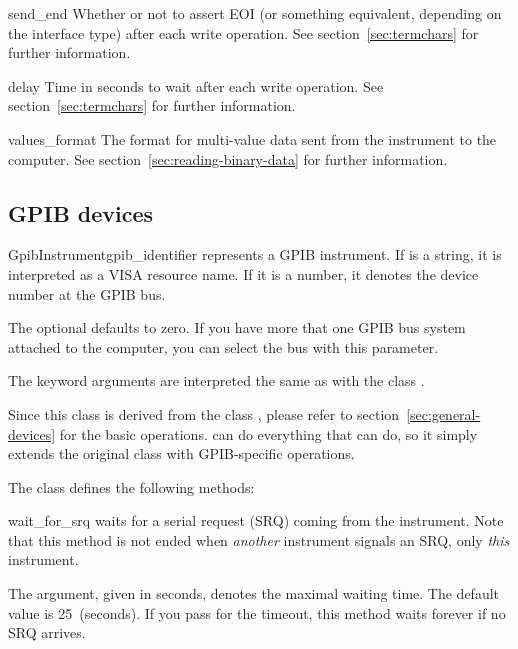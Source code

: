 \documentclass{howto}
\begin{document}
\begin{memberdesc}{send_end}
  Whether or not to assert EOI (or something equivalent, depending on the
  interface type) after each write operation.  See section~\ref{sec:termchars}
  for further information.
\end{memberdesc}

\begin{memberdesc}{delay}
  Time in seconds to wait after each write operation.  See
  section~\ref{sec:termchars} for further information.
\end{memberdesc}

\begin{memberdesc}{values_format}
  The format for multi-value data sent from the instrument to the computer.
  See section~\ref{sec:reading-binary-data} for further information.
\end{memberdesc}


\subsection{GPIB devices}
\label{sec:gpib-devices}

\begin{classdesc}{GpibInstrument}{gpib_identifier}
  represents a GPIB instrument.  If  is a string, it is
  interpreted as a VISA resource name.  If it is a number, it denotes the
  device number at the GPIB bus.

  The optional  defaults to zero.  If you have more that one
  GPIB bus system attached to the computer, you can select the bus with this
  parameter.

  The keyword arguments are interpreted the same as with the class
  .
\end{classdesc}

\begin{notice}
  Since this class is derived from the class , please refer
  to section~\ref{sec:general-devices} for the basic operations.
   can do everything that  can do, so
  it simply extends the original class with GPIB-specific operations.
\end{notice}

The class  defines the following methods:

\begin{methoddesc}{wait_for_srq}{}
  waits for a serial request (SRQ) coming from the instrument.  Note that this
  method is not ended when \emph{another} instrument signals an SRQ, only
  \emph{this} instrument.
  
  The  argument, given in seconds, denotes the maximal waiting
  time.  The default value is 25~(seconds).  If you pass  for the
  timeout, this method waits forever if no SRQ arrives.
\end{methoddesc}
\end{document}
